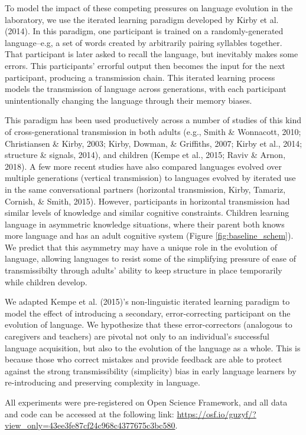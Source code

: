 \documentclass[10pt, letterpaper]{article}
\begin{document}
To model the impact of these competing pressures on language evolution
in the laboratory, we use the iterated learning paradigm developed by
Kirby et al. (2014). In this paradigm, one participant is trained on a
randomly-generated language--e.g, a set of words created by arbitrarily
pairing syllables together. That participant is later asked to recall
the language, but inevitably makes some errors. This participants'
errorful output then becomes the input for the next participant,
producing a transmission chain. This iterated learning process models
the transmission of language across generations, with each participant
unintentionally changing the language through their memory biases.

This paradigm has been used productively across a number of studies of
this kind of cross-generational transmission in both adults (e.g., Smith
\& Wonnacott, 2010; Christiansen \& Kirby, 2003; Kirby, Dowman, \&
Griffiths, 2007; Kirby et al., 2014; structure \& signals, 2014), and
children (Kempe et al., 2015; Raviv \& Arnon, 2018). A few more recent
studies have also compared languages evolved over multiple generations
(vertical transmission) to languages evolved by iterated use in the same
conversational partners (horizontal transmission, Kirby, Tamariz,
Cornish, \& Smith, 2015). However, participants in horizontal
transmission had similar levels of knowledge and similar cognitive
constraints. Children learning language in asymmetric knowledge
situations, where their parent both knows more language and has an adult
cognitive system (Figure \ref{fig:baseline_schem}). We predict that this
asymmetry may have a unique role in the evolution of language, allowing
languages to resist some of the simplifying pressure of ease of
transmissibilty through adults' ability to keep structure in place
temporarily while children develop.

We adapted Kempe et al. (2015)'s non-linguistic iterated learning
paradigm to model the effect of introducing a secondary,
error-correcting participant on the evolution of language. We
hypothesize that these error-correctors (analogous to caregivers and
teachers) are pivotal not only to an individual's successful language
acquisition, but also to the evolution of the language as a whole. This
is because those who correct mistakes and provide feedback are able to
protect against the strong transmissibility (simplicity) bias in early
language learners by re-introducing and preserving complexity in
language.

All experiments were pre-registered on Open Science Framework, and all
data and code can be accessed at the following link:
\url{https://osf.io/guzyf/?view_only=43ee3fe87cf24c968c4377675c3bc580}.
\end{document}

